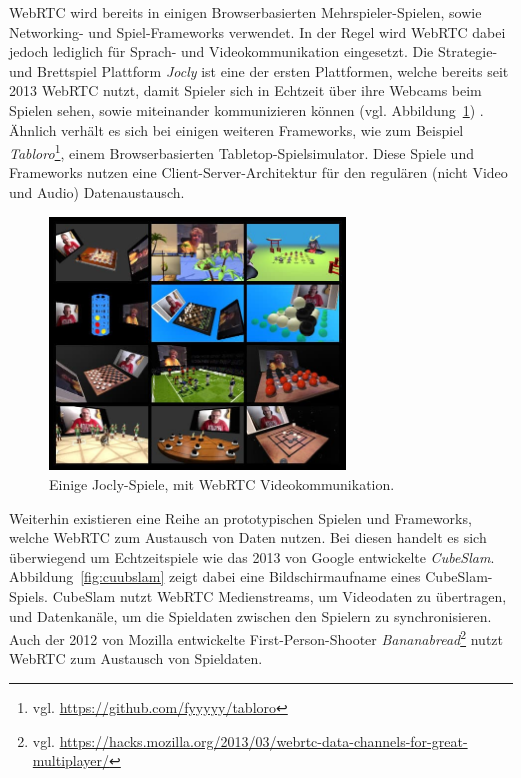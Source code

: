 \acs{WebRTC} wird bereits in einigen Browserbasierten Mehrspieler-Spielen, sowie Networking- und Spiel-Frameworks verwendet. In der Regel wird WebRTC dabei jedoch lediglich für Sprach- und Videokommunikation eingesetzt. Die Strategie- und Brettspiel Plattform \textit{Jocly} ist eine der ersten Plattformen, welche bereits seit 2013 \acs{WebRTC} nutzt, damit Spieler sich in Echtzeit über ihre Webcams beim Spielen sehen, sowie miteinander kommunizieren können (vgl. Abbildung~\ref{fig:jocly}) \cite{jocly2013}. Ähnlich verhält es sich bei einigen weiteren Frameworks, wie zum Beispiel \textit{Tabloro}\footnote{vgl. \url{https://github.com/fyyyyy/tabloro}}, einem Browserbasierten \glqq{}Tabletop\grqq{}-Spielsimulator. Diese Spiele und Frameworks nutzen eine Client-Server-Architektur für den regulären (nicht Video und Audio) Datenaustausch.\par

\begin{figure}[h]
\centering
\includegraphics[width=0.70\textwidth]{bilder/jocly-games.jpg}
\caption{Einige Jocly-Spiele, mit WebRTC Videokommunikation.}
\label{fig:jocly}
\end{figure}

Weiterhin existieren eine Reihe an prototypischen Spielen und Frameworks, welche \acs{WebRTC} zum Austausch von Daten nutzen. Bei diesen handelt es sich überwiegend um Echtzeitspiele wie das 2013 von Google entwickelte \textit{CubeSlam}. Abbildung~\ref{fig:cuubslam} zeigt dabei eine Bildschirmaufname eines CubeSlam-Spiels. CubeSlam nutzt \acs{WebRTC} Medienstreams, um Videodaten zu übertragen, und Datenkanäle, um die Spieldaten zwischen den Spielern zu synchronisieren. Auch der 2012 von Mozilla entwickelte First-Person-Shooter \textit{Bananabread}\footnote{vgl. \url{https://hacks.mozilla.org/2013/03/webrtc-data-channels-for-great-multiplayer/}} nutzt WebRTC zum Austausch von Spieldaten.\par

